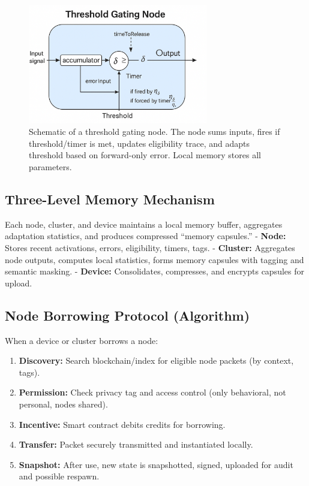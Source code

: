 \documentclass[11pt]{article}
\begin{document}
\begin{figure}[ht]
    \centering
    \includegraphics[width=0.7\textwidth]{architecture_diagrams/1fe38644-c569-4658-b345-f5d0ddced01b.png}
    \caption{
        Schematic of a threshold gating node. The node sums inputs, fires if threshold/timer is met, updates eligibility trace, and adapts threshold based on forward-only error. Local memory stores all parameters.
    }
    \label{fig:threshold-gating-node}
\end{figure}

\subsection{Three-Level Memory Mechanism}

Each node, cluster, and device maintains a local memory buffer, aggregates adaptation statistics, and produces compressed “memory capsules.”  
- \textbf{Node:} Stores recent activations, errors, eligibility, timers, tags.  
- \textbf{Cluster:} Aggregates node outputs, computes local statistics, forms memory capsules with tagging and semantic masking.
- \textbf{Device:} Consolidates, compresses, and encrypts capsules for upload.

\subsection{Node Borrowing Protocol (Algorithm)}

When a device or cluster borrows a node:
\begin{enumerate}
    \item \textbf{Discovery:} Search blockchain/index for eligible node packets (by context, tags).
    \item \textbf{Permission:} Check privacy tag and access control (only behavioral, not personal, nodes shared).
    \item \textbf{Incentive:} Smart contract debits credits for borrowing.
    \item \textbf{Transfer:} Packet securely transmitted and instantiated locally.
    \item \textbf{Snapshot:} After use, new state is snapshotted, signed, uploaded for audit and possible respawn.
\end{enumerate}
\end{document}

